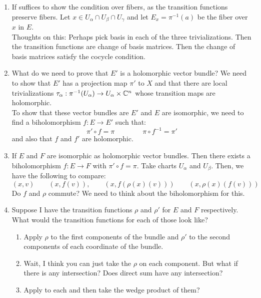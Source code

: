 \documentclass[12pt]{article}
\begin{document}
\begin{solu}
    \bbni
    \begin{enumerate}
        \item If suffices to show the condition over fibers, as the transition functions preserve fibers. Let $x \in U_\alpha \cap U_\beta \cap U_\gamma$ and let $E_x = \pi^{-1}(a)$ be the fiber over $x$ in $E$. \\
        Thoughts on this: Perhaps pick basis in each of the three trivializations. Then the transition functions are change of basis matrices. Then the change of basis matrices satisfy the cocycle condition. 
        \item What do we need to prove that $E'$ is a holomorphic vector bundle? We need to show that $E'$ has a projection map $\pi'$ to $X$ and that there are local trivializations $\tau_{\alpha}: \pi^{-1}(U_\alpha) \to U_\alpha \times \mathbb C^n$ whose transition maps are holomorphic. \\
        To show that these vector bundles are $E'$ and $E$ are isomorphic, we need to find a biholomorphism $f : E \to E'$ such that: 
        \[ \pi' \circ f = \pi \qquad \qquad \pi \circ f^{-1} = \pi' \]
        and also that $f$ and $f'$ are holomorphic.
        \item If $E$ and $F$ are isomorphic as holomorphic vector bundles. Then there exists a biholomorphism $f : E \to F$ with $\pi' \circ f = \pi$. Take charts $U_\alpha$ and $U_\beta$. Then, we have the following to compare: 
        \[ (x, v) \qquad (x, f(v)), \qquad (x, f(\rho(x)(v))) \qquad (x, \rho(x)(f(v))) \]
        Do $f$ and $\rho$ commute? We need to think about the biholomorphism for this. 
        \item Suppose I have the transition functions $\rho$ and $\rho'$ for $E$ and $F$ respectively. What would the transition functions for each of those look like?
        \begin{enumerate}
            \item Apply $\rho$ to the first components of the bundle and $\rho'$ to the second components of each coordinate of the bundle. 
            \item Wait, I think you can just take the $\rho$ on each component. But what if there is any intersection? Does direct sum have any intersection?
            \item Apply to each and then take the wedge product of them?
        \end{enumerate}
        
    \end{enumerate}
\end{solu}
\end{document}
